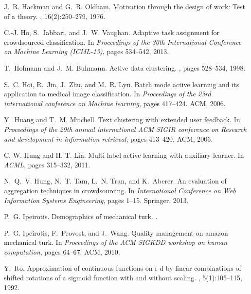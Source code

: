 \documentclass[11pt]{article}
\begin{document}
\begin{thebibliography}{10}
	J.~R. Hackman and G.~R. Oldham.
	\newblock Motivation through the design of work: Test of a theory.
	, 16(2):250--279,
	1976.
	
	C.-J. Ho, S.~Jabbari, and J.~W. Vaughan.
	\newblock Adaptive task assignment for crowdsourced classification.
	\newblock In {\em Proceedings of the 30th International Conference on Machine
		Learning (ICML-13)}, pages 534--542, 2013.
	
	T.~Hofmann and J.~M. Buhmann.
	\newblock Active data clustering.
	, pages
	528--534, 1998.
	
	S.~C. Hoi, R.~Jin, J.~Zhu, and M.~R. Lyu.
	\newblock Batch mode active learning and its application to medical image
	classification.
	\newblock In {\em Proceedings of the 23rd international conference on Machine
		learning}, pages 417--424. ACM, 2006.
	
	Y.~Huang and T.~M. Mitchell.
	\newblock Text clustering with extended user feedback.
	\newblock In {\em Proceedings of the 29th annual international ACM SIGIR
		conference on Research and development in information retrieval}, pages
	413--420. ACM, 2006.
	
	C.-W. Hung and H.-T. Lin.
	\newblock Multi-label active learning with auxiliary learner.
	\newblock In {\em ACML}, pages 315--332, 2011.
	
	N.~Q.~V. Hung, N.~T. Tam, L.~N. Tran, and K.~Aberer.
	\newblock An evaluation of aggregation techniques in crowdsourcing.
	\newblock In {\em International Conference on Web Information Systems
		Engineering}, pages 1--15. Springer, 2013.
	
	P.~G. Ipeirotis.
	\newblock Demographics of mechanical turk.
	.
	
	P.~G. Ipeirotis, F.~Provost, and J.~Wang.
	\newblock Quality management on amazon mechanical turk.
	\newblock In {\em Proceedings of the ACM SIGKDD workshop on human computation},
	pages 64--67. ACM, 2010.
	
	Y.~Ito.
	\newblock Approximation of continuous functions on r d by linear combinations
	of shifted rotations of a sigmoid function with and without scaling.
	, 5(1):105--115, 1992.
	

\end{thebibliography}
\end{document}
